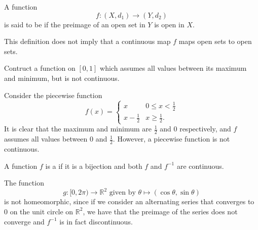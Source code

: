 \documentclass[notoc,notitlepage]{tufte-book}
\begin{document}
\begin{defn}\label{defn:continuous_map}
  A function
  \begin{equation*}
    f : (X, d_1) \to (Y, d_2)
  \end{equation*}
  is said to be  if the preimage of an open set in $Y$ is open in $X$.
\end{defn}

\begin{warn}
  This definition does not imply that a continuous map $f$ maps open sets to open sets.
\end{warn}

\begin{ex}
  Contruct a function on $[0, 1]$ which assumes all values between its maximum and minimum, but is not continuous.
\end{ex}

\begin{solution}
  Consider the piecewise function
  \begin{equation*}
    f(x) = \begin{cases}
      x & 0 \leq x < \frac{1}{2} \\
      x - \frac{1}{2} & x \geq \frac{1}{2}.
    \end{cases}
  \end{equation*}
  It is clear that the maximum and minimum are $\frac{1}{2}$ and $0$ respectively, and $f$ assumes all values between $0$ and $\frac{1}{2}$. However, a piecewise function is not continuous.
\end{solution}

\begin{defn}[Homeomorphism]\label{defn:homeomorphism}
  A function $f$ is a  if it is a bijection and both $f$ and $f^{-1}$ are continuous.
\end{defn}

\begin{eg}
  The function
  \begin{equation*}
    g : [ 0, 2\pi ) \to \mathbb{R}^2 \text{ given by } \theta \mapsto (\cos \theta, \sin \theta)
  \end{equation*}
  is not homeomorphic, since if we consider an alternating series that converges to $0$ on the unit circle on $\mathbb{R}^2$, we have that the preimage of the series does not converge and $f^{-1}$ is in fact discontinuous.
\end{eg}
\end{document}
